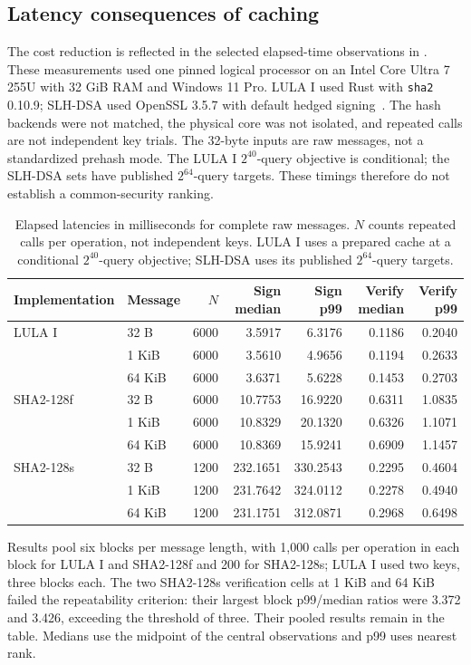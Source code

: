 \subsection{Latency consequences of caching}\label{sec:experiments}
The cost reduction is reflected in the selected elapsed-time observations in . These measurements used one pinned logical processor on an Intel Core Ultra 7 255U with 32 GiB RAM and Windows 11 Pro. LULA I used Rust with \texttt{sha2} 0.10.9; SLH-DSA used OpenSSL 3.5.7 with default hedged signing~\cite{openssl}. The hash backends were not matched, the physical core was not isolated, and repeated calls are not independent key trials. The 32-byte inputs are raw messages, not a standardized prehash mode. The LULA I $2^{40}$-query objective is conditional; the SLH-DSA sets have published $2^{64}$-query targets. These timings therefore do not establish a common-security ranking.

\begin{table}[t]
\caption{Elapsed latencies in milliseconds for complete raw messages. $N$ counts repeated calls per operation, not independent keys. LULA I uses a prepared cache at a conditional $2^{40}$-query objective; SLH-DSA uses its published $2^{64}$-query targets.}\label{tab:eval-warm}
\centering\small\setlength{\tabcolsep}{3pt}
\begin{tabular}{llrrrrr}\toprule
Implementation & Message & $N$ & Sign median & Sign p99 & Verify median & Verify p99\\\midrule
LULA I &32 B&6000&3.5917&6.3176&0.1186&0.2040\\
&1 KiB&6000&3.5610&4.9656&0.1194&0.2633\\
&64 KiB&6000&3.6371&5.6228&0.1453&0.2703\\\midrule
SHA2-128f &32 B&6000&10.7753&16.9220&0.6311&1.0835\\
&1 KiB&6000&10.8329&20.1320&0.6326&1.1071\\
&64 KiB&6000&10.8369&15.9241&0.6909&1.1457\\\midrule
SHA2-128s &32 B&1200&232.1651&330.2543&0.2295&0.4604\\
&1 KiB&1200&231.7642&324.0112&0.2278&0.4940\\
&64 KiB&1200&231.1751&312.0871&0.2968&0.6498\\\bottomrule
\end{tabular}
\end{table}

Results pool six blocks per message length, with 1,000 calls per operation in each block for LULA I and SHA2-128f and 200 for SHA2-128s; LULA I used two keys, three blocks each. The two SHA2-128s verification cells at 1 KiB and 64 KiB failed the repeatability criterion: their largest block p99/median ratios were 3.372 and 3.426, exceeding the threshold of three. Their pooled results remain in the table. Medians use the midpoint of the central observations and p99 uses nearest rank.

